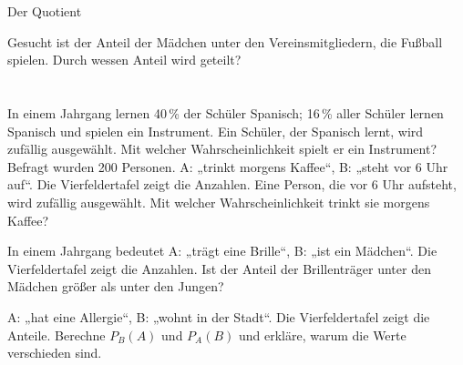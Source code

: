 \setcounter{aufgabe}{7}

\begin{aufgabe}{Der Quotient}
\begin{teile}
\teil Gesucht ist der Anteil der Mädchen unter den Vereinsmitgliedern, die Fußball spielen. Durch wessen Anteil wird geteilt? \\  \\  \\ 
\teil In einem Jahrgang lernen 40\,\% der Schüler Spanisch; 16\,\% aller Schüler lernen Spanisch und spielen ein Instrument. Ein Schüler, der Spanisch lernt, wird zufällig ausgewählt. Mit welcher Wahrscheinlichkeit spielt er ein Instrument? \leerfeld
\teil Befragt wurden 200 Personen. A: „trinkt morgens Kaffee“, B: „steht vor 6 Uhr auf“. Die Vierfeldertafel zeigt die Anzahlen. Eine Person, die vor 6 Uhr aufsteht, wird zufällig ausgewählt. Mit welcher Wahrscheinlichkeit trinkt sie morgens Kaffee?

\leerfeld
\teil In einem Jahrgang bedeutet A: „trägt eine Brille“, B: „ist ein Mädchen“. Die Vierfeldertafel zeigt die Anzahlen. Ist der Anteil der Brillenträger unter den Mädchen größer als unter den Jungen?

\teil A: „hat eine Allergie“, B: „wohnt in der Stadt“. Die Vierfeldertafel zeigt die Anteile. Berechne $P_B(A)$ und $P_A(B)$ und erkläre, warum die Werte verschieden sind.

\end{teile}
\end{aufgabe}

